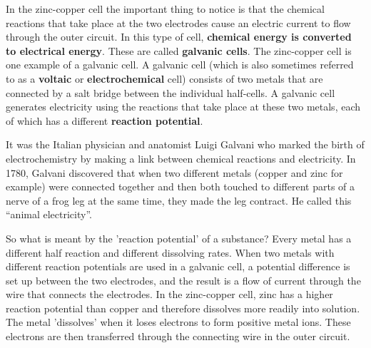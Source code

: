 In the zinc-copper cell the important thing to notice is that the chemical reactions that take place at the two electrodes cause an electric current to flow through the outer circuit. In this type of cell, \textbf{chemical energy is converted to electrical energy}. These are called \textbf{galvanic cells}. The zinc-copper cell is one example of a galvanic cell. A galvanic cell (which is also sometimes referred to as a \textbf{voltaic} or \textbf{electrochemical} cell) consists of two metals that are connected by a salt bridge between the individual half-cells. A galvanic cell generates electricity using the reactions that take place at these two metals, each of which has a different \textbf{reaction potential}.\\

\begin{IFact}{It was the Italian physician and anatomist Luigi Galvani
    who marked the birth of electrochemistry by making a link between
    chemical reactions and electricity. In 1780, Galvani discovered
    that when two different metals (copper and zinc for example) were
    connected together and then both touched to different parts of a
    nerve of a frog leg at the same time, they made the leg
    contract. He called this ``animal electricity''.
}
\end{IFact}

So what is meant by the 'reaction potential' of a substance? Every metal has a different half reaction and different dissolving rates. When two metals with different reaction potentials are used in a galvanic cell, a potential difference is set up between the two electrodes, and the result is a flow of current through the wire that connects the electrodes. In the zinc-copper cell, zinc has a higher reaction potential than copper and therefore dissolves more readily into solution. The metal 'dissolves' when it loses electrons to form positive metal ions. These electrons are then transferred through the connecting wire in the outer circuit. 


